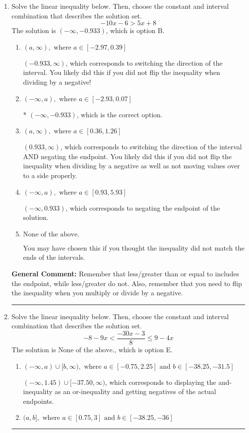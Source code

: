 \documentclass{extbook}[14pt]
\newcommand{\litem}[1]{\item #1

\rule{\textwidth}{0.4pt}}
\begin{document}
\begin{enumerate}
{\textbf{General Comment:} When thinking about this language, it helps to draw a number line and try points.
}
\litem{
Solve the linear inequality below. Then, choose the constant and interval combination that describes the solution set.
\[ -10x -6 > 5x + 8 \]The solution is \( (-\infty, -0.933) \), which is option B.\begin{enumerate}[label=\Alph*.]
\item \( (a, \infty), \text{ where } a \in [-2.97, 0.39] \)

 $(-0.933, \infty)$, which corresponds to switching the direction of the interval. You likely did this if you did not flip the inequality when dividing by a negative!
\item \( (-\infty, a), \text{ where } a \in [-2.93, 0.07] \)

* $(-\infty, -0.933)$, which is the correct option.
\item \( (a, \infty), \text{ where } a \in [0.36, 1.26] \)

 $(0.933, \infty)$, which corresponds to switching the direction of the interval AND negating the endpoint. You likely did this if you did not flip the inequality when dividing by a negative as well as not moving values over to a side properly.
\item \( (-\infty, a), \text{ where } a \in [0.93, 5.93] \)

 $(-\infty, 0.933)$, which corresponds to negating the endpoint of the solution.
\item \( \text{None of the above}. \)

You may have chosen this if you thought the inequality did not match the ends of the intervals.
\end{enumerate}

\textbf{General Comment:} Remember that less/greater than or equal to includes the endpoint, while less/greater do not. Also, remember that you need to flip the inequality when you multiply or divide by a negative.
}
\litem{
Solve the linear inequality below. Then, choose the constant and interval combination that describes the solution set.
\[ -8 - 9 x < \frac{-30 x - 3}{8} \leq 9 - 4 x \]The solution is \( \text{None of the above.} \), which is option E.\begin{enumerate}[label=\Alph*.]
\item \( (-\infty, a) \cup [b, \infty), \text{ where } a \in [-0.75, 2.25] \text{ and } b \in [-38.25, -31.5] \)

$(-\infty, 1.45) \cup [-37.50, \infty)$, which corresponds to displaying the and-inequality as an or-inequality and getting negatives of the actual endpoints.
\item \( (a, b], \text{ where } a \in [0.75, 3] \text{ and } b \in [-38.25, -36] \)


\end{enumerate}}
\end{enumerate}
\end{document}
